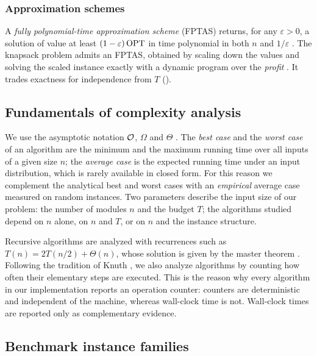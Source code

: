 \subsubsection{Approximation schemes}

A \emph{fully polynomial-time approximation scheme} (FPTAS) returns, for any $\varepsilon>0$, a solution of value at least $(1-\varepsilon)\,\mathrm{OPT}$ in time polynomial in both $n$ and $1/\varepsilon$ \cite{vazirani2001,williamson2011}. The knapsack problem admits an FPTAS, obtained by scaling down the values and solving the scaled instance exactly with a dynamic program over the \emph{profit} \cite{ibarra1975,lawler1979}. It trades exactness for independence from $T$ ().

\subsection{Fundamentals of complexity analysis}

We use the asymptotic notation $\mathcal{O}$, $\Omega$ and $\Theta$ \cite{cormen2022}. The \emph{best case} and the \emph{worst case} of an algorithm are the minimum and the maximum running time over all inputs of a given size $n$; the \emph{average case} is the expected running time under an input distribution, which is rarely available in closed form. For this reason we complement the analytical best and worst cases with an \emph{empirical} average case measured on random instances. Two parameters describe the input size of our problem: the number of modules $n$ and the budget $T$; the algorithms studied depend on $n$ alone, on $n$ and $T$, or on $n$ and the instance structure.

Recursive algorithms are analyzed with recurrences such as $T(n)=2T(n/2)+\Theta(n)$, whose solution is given by the master theorem \cite{cormen2022}. Following the tradition of Knuth \cite{knuth1998}, we also analyze algorithms by counting how often their elementary steps are executed. This is the reason why every algorithm in our implementation reports an operation counter: counters are deterministic and independent of the machine, whereas wall-clock time is not. Wall-clock times are reported only as complementary evidence.

\subsection{Benchmark instance families}

